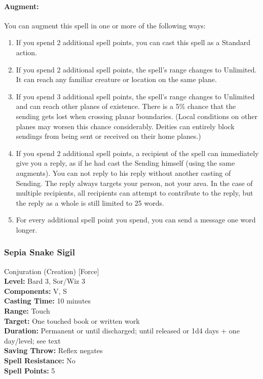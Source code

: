 \paragraph{Augment:} You can augment this spell in one or more of the following ways:
\begin{enumerate}
 \item If you spend 2 additional spell points, you can cast this spell as a Standard action.
 \item If you spend 2 additional spell points, the spell's range changes to Unlimited. It can reach any familiar creature or location on the same plane.
 \item If you spend 3 additional spell points, the spell's range changes to Unlimited and can reach other planes of existence. There is a 5\% chance that the sending gets lost when crossing planar boundaries. (Local conditions on other planes may worsen this chance considerably. Deities can entirely block sendings from being sent or received on their home planes.)
 \item If you spend 2 additional spell points, a recipient of the spell can immediately give you a reply, as if he had cast the Sending himself (using the same augments). You can not reply to his reply without another casting of Sending. The reply always targets your person, not your area. In the case of multiple recipients, all recipients can attempt to contribute to the reply, but the reply as a whole is still limited to 25 words.
 \item For every additional spell point you spend, you can send a message one word longer.
\end{enumerate}

\subsubsection{Sepia Snake Sigil}
\label{Spell:SepiaSnakeSigil}
Conjuration (Creation) [Force]
\\ \textbf{Level:} Bard 3, Sor/Wiz 3
\\ \textbf{Components:} V, S
\\ \textbf{Casting Time:} 10 minutes
\\ \textbf{Range:} Touch
\\ \textbf{Target:} One touched book or written work
\\ \textbf{Duration:} Permanent or until discharged; until released or 1d4 days + one day/level; see text
\\ \textbf{Saving Throw:} Reflex negates
\\ \textbf{Spell Resistance:} No
\\ \textbf{Spell Points:} 5

